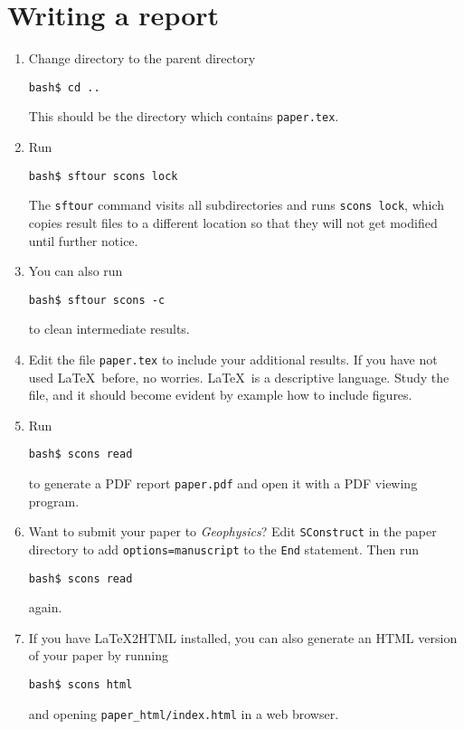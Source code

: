 \section{Writing a report}

\begin{enumerate}
\item Change directory to the parent directory
\begin{verbatim}
bash$ cd ..
\end{verbatim}
This should be the directory which contains \texttt{paper.tex}.
\item Run
\begin{verbatim}
bash$ sftour scons lock
\end{verbatim}
The \texttt{sftour} command visits all subdirectories and runs \texttt{scons lock}, which copies result files to a different location so that they will not get modified until further notice.
\item You can also run
\begin{verbatim}
bash$ sftour scons -c
\end{verbatim}
to clean intermediate results.
\item Edit the file \texttt{paper.tex} to include your additional results. If you have not used \LaTeX\ before, no worries. \LaTeX\ is a descriptive language. Study the file, and it should become evident by example how to include figures.
\item Run
\begin{verbatim}
bash$ scons read
\end{verbatim}
to generate a PDF report \texttt{paper.pdf} and open it with a PDF viewing program. 
\item Want to submit your paper to \emph{Geophysics}? Edit \texttt{SConstruct} in the 
paper directory to add \texttt{options=manuscript} to the \texttt{End} statement. Then run
\begin{verbatim}
bash$ scons read
\end{verbatim}
again.
\item If you have \LaTeX2HTML installed, you can also generate an HTML version of your paper by running
\begin{verbatim}
bash$ scons html
\end{verbatim}
and opening \verb#paper_html/index.html# in a web browser.
\end{enumerate}





